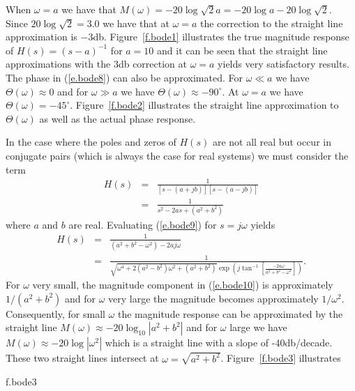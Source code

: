 When $\omega=a$ we have that $M(\omega)=-20\log\sqrt{2}a=-20\log a
-20\log\sqrt{2}$.  Since $20\log\sqrt{2}=3.0$ we have that at $\omega=a$
the correction to the straight line approximation is $-3$db.
Figure~\ref{f.bode1} illustrates the true magnitude response of 
$H(s)=(s-a)^{-1}$ for $a=10$
and it can be seen that the straight line approximations
with the 3db correction at $\omega=a$ yields very satisfactory results.
The phase in (\ref{e.bode8}) can also be approximated.  For $\omega\ll a$
we have $\Theta(\omega)\approx 0$ and for $\omega\gg a$ we have
$\Theta(\omega)\approx -90^{\circ}$.  At $\omega=a$ we have $\Theta(\omega)
=-45^{\circ}$.  Figure~\ref{f.bode2} illustrates the straight line 
approximation to $\Theta(\omega)$ as well as the actual phase response.
%

%

  In the case where the  poles and zeros of $H(s)$ are not all real
but occur in conjugate pairs (which is always the case
for real systems) we must consider the term 
%
\begin{eqnarray}
H(s)&=&\frac{1}{[s-(a+jb)][s-(a-jb)]}\nonumber\\
    &=&\frac{1}{s^2-2as+(a^2+b^2)}
\label{e.bode9}
\end{eqnarray}
%
where $a$ and $b$ are real.  Evaluating (\ref{e.bode9}) for $s=j\omega$
yields
%
\begin{eqnarray}
H(s)&=&\frac{1}{(a^2+b^2-\omega^2)-2aj\omega}\nonumber\\
    &=&\frac{1}{\sqrt{\omega^4+2(a^2-b^2)\omega^2+(a^2+b^2)}\exp(j\tan^{-1}[\frac{-2a\omega}{a^2+b^2-\omega^2}])}.
\label{e.bode10}
\end{eqnarray}
%
For $\omega$ very small, the magnitude component in (\ref{e.bode10}) is
approximately $1/(a^2+b^2)$ and for $\omega$ very large the magnitude
becomes approximately $1/\omega^2$.  Consequently, for small $\omega$
the magnitude response can be approximated by the straight line 
$M(\omega)\approx-20\log_{10}|a^2+b^2|$ and for $\omega$ large we have
$M(\omega)\approx-20\log|\omega^2|$ which is a 
straight line with a slope of -40db/decade.  These two straight lines
intersect at $\omega=\sqrt{a^2+b^2}$.  Figure~\ref{f.bode3} illustrates
%

{f.bode3}

